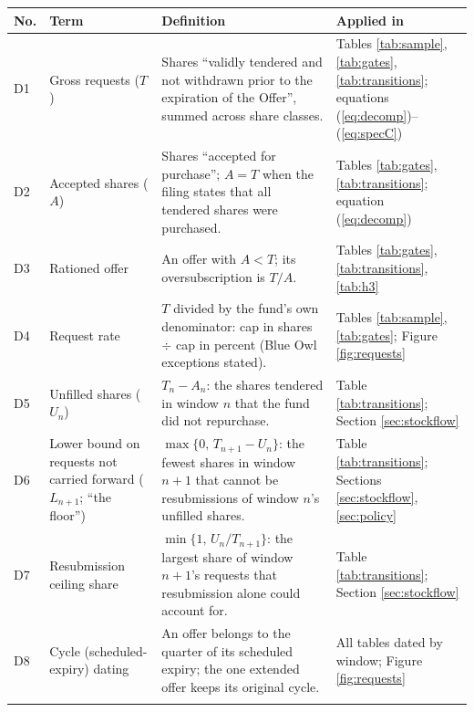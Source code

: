 \begin{tabular}{>{\raggedright\arraybackslash}p{}>{\raggedright\arraybackslash}p{}>{\raggedright\arraybackslash}p{}>{\raggedright\arraybackslash}p{}}\toprule
No. & Term & Definition & Applied in \\ \midrule
D1 & Gross requests ($T$) & Shares ``validly tendered and not withdrawn prior to the expiration of the Offer'', summed across share classes. & Tables \ref{tab:sample}, \ref{tab:gates}, \ref{tab:transitions}; equations (\ref{eq:decomp})--(\ref{eq:specC}) \\ \addlinespace[1pt]
D2 & Accepted shares ($A$) & Shares ``accepted for purchase''; $A=T$ when the filing states that all tendered shares were purchased. & Tables \ref{tab:gates}, \ref{tab:transitions}; equation (\ref{eq:decomp}) \\ \addlinespace[1pt]
D3 & Rationed offer & An offer with $A<T$; its oversubscription is $T/A$. & Tables \ref{tab:gates}, \ref{tab:transitions}, \ref{tab:h3} \\ \addlinespace[1pt]
D4 & Request rate & $T$ divided by the fund's own denominator: cap in shares $\div$ cap in percent (Blue Owl exceptions stated). & Tables \ref{tab:sample}, \ref{tab:gates}; Figure \ref{fig:requests} \\ \addlinespace[1pt]
D5 & Unfilled shares ($U_n$) & $T_n-A_n$: the shares tendered in window $n$ that the fund did not repurchase. & Table \ref{tab:transitions}; Section \ref{sec:stockflow} \\ \addlinespace[1pt]
D6 & Lower bound on requests not carried forward ($L_{n+1}$; ``the floor'') & $\max\{0,\,T_{n+1}-U_n\}$: the fewest shares in window $n+1$ that cannot be resubmissions of window $n$'s unfilled shares. & Table \ref{tab:transitions}; Sections \ref{sec:stockflow}, \ref{sec:policy} \\ \addlinespace[1pt]
D7 & Resubmission ceiling share & $\min\{1,\,U_n/T_{n+1}\}$: the largest share of window $n+1$'s requests that resubmission alone could account for. & Table \ref{tab:transitions}; Section \ref{sec:stockflow} \\ \addlinespace[1pt]
D8 & Cycle (scheduled-expiry) dating & An offer belongs to the quarter of its scheduled expiry; the one extended offer keeps its original cycle. & All tables dated by window; Figure \ref{fig:requests} \\ \addlinespace[1pt]

\end{tabular}

